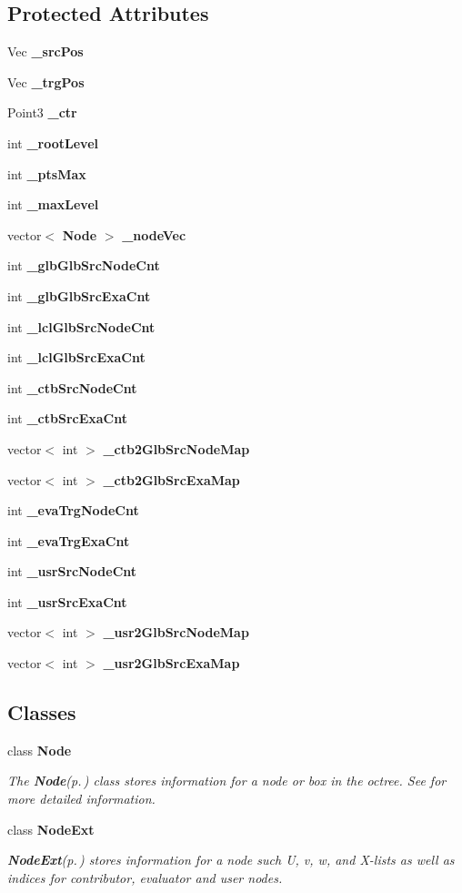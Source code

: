 \subsection*{Protected Attributes}
\begin{CompactItemize}
\item 
Vec {\bf \_\-src\-Pos}
\item 
Vec {\bf \_\-trg\-Pos}
\item 
Point3 {\bf \_\-ctr}
\item 
int {\bf \_\-root\-Level}
\item 
int {\bf \_\-pts\-Max}
\item 
int {\bf \_\-max\-Level}
\item 
vector$<$ {\bf Node} $>$ {\bf \_\-node\-Vec}
\item 
int {\bf \_\-glb\-Glb\-Src\-Node\-Cnt}
\item 
int {\bf \_\-glb\-Glb\-Src\-Exa\-Cnt}
\item 
int {\bf \_\-lcl\-Glb\-Src\-Node\-Cnt}
\item 
int {\bf \_\-lcl\-Glb\-Src\-Exa\-Cnt}
\item 
int {\bf \_\-ctb\-Src\-Node\-Cnt}
\item 
int {\bf \_\-ctb\-Src\-Exa\-Cnt}
\item 
vector$<$ int $>$ {\bf \_\-ctb2Glb\-Src\-Node\-Map}
\item 
vector$<$ int $>$ {\bf \_\-ctb2Glb\-Src\-Exa\-Map}
\item 
int {\bf \_\-eva\-Trg\-Node\-Cnt}
\item 
int {\bf \_\-eva\-Trg\-Exa\-Cnt}
\item 
int {\bf \_\-usr\-Src\-Node\-Cnt}
\item 
int {\bf \_\-usr\-Src\-Exa\-Cnt}
\item 
vector$<$ int $>$ {\bf \_\-usr2Glb\-Src\-Node\-Map}
\item 
vector$<$ int $>$ {\bf \_\-usr2Glb\-Src\-Exa\-Map}
\end{CompactItemize}
\subsection*{Classes}
\begin{CompactItemize}
\item 
class {\bf Node}
\begin{CompactList}\small\item\em The {\bf Node}{\rm (p.\,\pageref{classLet3d__MPI_1_1Node})} class stores information for a node or box in the octree. See for more detailed information. \item\end{CompactList}\item 
class {\bf Node\-Ext}
\begin{CompactList}\small\item\em {\bf Node\-Ext}{\rm (p.\,\pageref{classLet3d__MPI_1_1NodeExt})} stores information for a node such U, v, w, and X-lists as well as indices for contributor, evaluator and user nodes. \item\end{CompactList}\end{CompactItemize}


